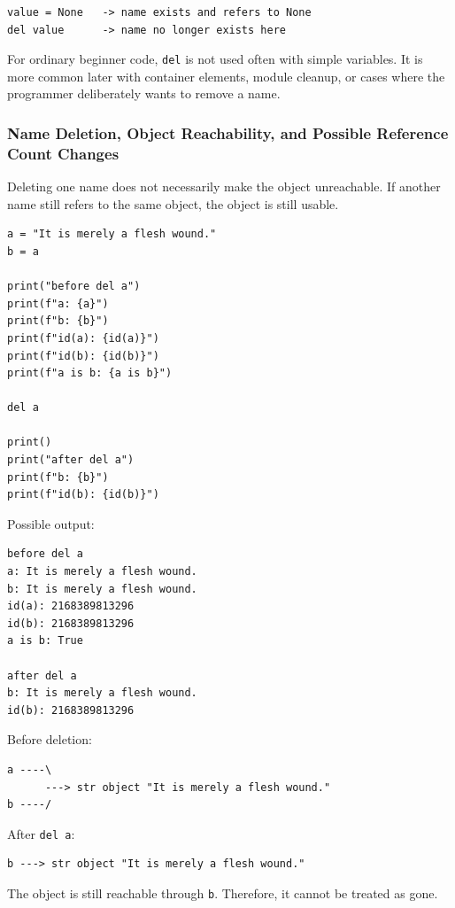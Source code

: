 \begin{verbatim}
value = None   -> name exists and refers to None
del value      -> name no longer exists here
\end{verbatim}

For ordinary beginner code, \texttt{del} is not used often with simple variables. It is more common later with container elements, module cleanup, or cases where the programmer deliberately wants to remove a name.

\subsubsection{Name Deletion, Object Reachability, and Possible Reference Count Changes}

Deleting one name does not necessarily make the object unreachable. If another name still refers to the same object, the object is still usable.

\begin{verbatim}
a = "It is merely a flesh wound."
b = a

print("before del a")
print(f"a: {a}")
print(f"b: {b}")
print(f"id(a): {id(a)}")
print(f"id(b): {id(b)}")
print(f"a is b: {a is b}")

del a

print()
print("after del a")
print(f"b: {b}")
print(f"id(b): {id(b)}")
\end{verbatim}

Possible output:

\begin{verbatim}
before del a
a: It is merely a flesh wound.
b: It is merely a flesh wound.
id(a): 2168389813296
id(b): 2168389813296
a is b: True

after del a
b: It is merely a flesh wound.
id(b): 2168389813296
\end{verbatim}

Before deletion:

\begin{verbatim}
a ----\
      ---> str object "It is merely a flesh wound."
b ----/
\end{verbatim}

After \texttt{del a}:

\begin{verbatim}
b ---> str object "It is merely a flesh wound."
\end{verbatim}

The object is still reachable through \texttt{b}. Therefore, it cannot be treated as gone.

